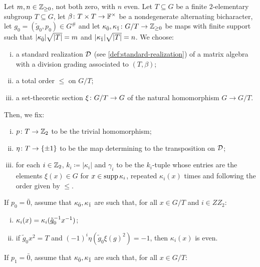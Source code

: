 \begin{defi}\label{def:model-grd-M(m-n-0)}
    Let $m, n\in \mathbb{Z}_{\geq 0}$, not both zero, with $n$ even. 
    Let $T \subseteq G$ be a finite $2$-elementary subgroup $T \subseteq G$, let $\beta\colon T\times T \to \mathbb{F}^\times$ be a nondegenerate alternating bicharacter, let $g_0 = (\tilde g_0, p_0) \in G^\#$ and let $\kappa_{\bar{0}}, \kappa_{\bar{1}} \colon G/T \to \mathbb{Z}_{\geq 0}$ be maps with finite support such that $|\kappa_{\bar{0}}| \sqrt{|T|} = m$ and $|\kappa_{\bar{1}}| \sqrt{|T|} = n$. 
    We choose:
    \begin{enumerate}[(i)]
        \item a standard realization $\mathcal{D}$ (see \cref{def:standard-realization}) of a matrix algebra with a division grading associated to $(T,\beta)$;
        \item a total order $\leq$ on $G/T$;
        \item a set-theoretic section $\xi\colon G/T \to G$ of the natural homomorphism $G \to G/T$.
        \setcounter{enumi-all}{\value{enumi}}
    \end{enumerate}
    Then, we fix:
    \begin{enumerate}[(i)]
        \setcounter{enumi}{\value{enumi-all}}
        \item $p\colon T \to \mathbb{Z}_2$ to be the trivial homomorphism; 
        \item $\eta\colon T \to \{ \pm 1 \}$ to be the map determining to the transposition on $\mathcal{D}$; 
        \item for each $i\in \mathbb{Z}_2$, $k_i \coloneqq |\kappa_i|$ and $\gamma_i$ to be the $k_i$-tuple whose entries are the elements $\xi(x) \in G$ for $x\in \operatorname{supp} \kappa_i$, repeated $\kappa_i(x)$ times and following the order given by $\leq$. 
        \setcounter{enumi-all}{\value{enumi}}
    \end{enumerate}
    If $p_0 = \bar 0$, assume that $\kappa_{\bar{0}}, \kappa_{\bar{1}}$ are such that, for all $x\in G/T$ and $i \in ZZ_2$:
    \begin{enumerate}[(i)]
        \setcounter{enumi}{\value{enumi-all}}
        \item $\kappa_i(x) = \kappa_i(\tilde g_0^{-1} x^{-1})$;
        \item if $\tilde g_0 x^2 = T$ and $(-1)^i \eta(\tilde g_0 \xi(g)^2) = -1$, then $\kappa_i(x)$ is even.
        \setcounter{enumi-all}{\value{enumi}}
    \end{enumerate}
    If $p_1 = \bar 0$, assume that $\kappa_{\bar{0}}, \kappa_{\bar{1}}$ are such that, for all $x\in G/T$:

\end{defi}

